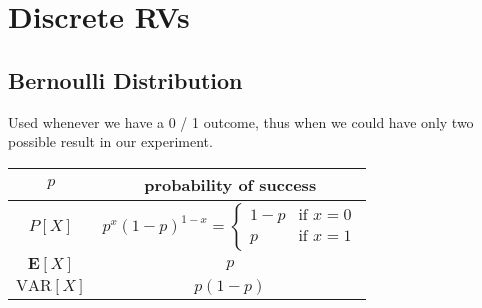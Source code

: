 \chapter{Discrete RVs}

\section{Bernoulli Distribution}
\begin{tcolorbox}
Used whenever we have a 0 / 1 outcome, thus when we could have only two possible result in our experiment.
\end{tcolorbox}

\begingroup
\setlength{\tabcolsep}{10pt} %
\renewcommand{\arraystretch}{1.5} %
\begin{center}
\begin{tabular}{ |c|c| } 
\hline
\(p\) & probability of success \\ \hline
\(P[X]\) & $p^x(1 - p)^{1-x} = \begin{cases} 1 - p & \mbox{if } x = 0 \\p & \mbox{if } x = 1 
\end{cases}$ \\ \hline
\(\mathbf{E}[X]\) & $p$ \\ \hline
\(\text{VAR}[X]\) & $p(1 - p)$ \\ \hline
\end{tabular}
\end{center}
\endgroup





